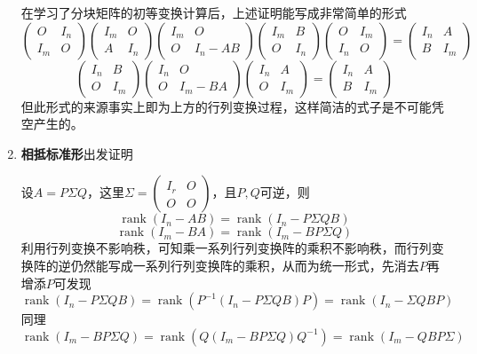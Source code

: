 \documentclass[a4paper,UTF8,fontset=windows]{ctexart}
\DeclareMathOperator{\rank}{rank}
\newcommand*{\note}{\noindent *}
\begin{document}
\begin{enumerate}
    \note 在学习了分块矩阵的初等变换计算后，上述证明能写成非常简单的形式
    $$\begin{pmatrix}O&I_n\\I_m&O\end{pmatrix}\begin{pmatrix}I_m&O\\A&I_n\end{pmatrix}\begin{pmatrix}I_m&O\\O&I_n-AB\end{pmatrix}\begin{pmatrix}I_m&B\\O&I_n\end{pmatrix}\begin{pmatrix}O&I_m\\I_n&O\end{pmatrix}=\begin{pmatrix}I_n&A\\B&I_m\end{pmatrix}$$
    $$\begin{pmatrix}I_n&B\\O&I_m\end{pmatrix}\begin{pmatrix}I_n&O\\O&I_m-BA\end{pmatrix}\begin{pmatrix}I_n&A\\O&I_m\end{pmatrix}=\begin{pmatrix}I_n&A\\B&I_m\end{pmatrix}$$
    但此形式的来源事实上即为上方的行列变换过程，这样简洁的式子是不可能凭空产生的。

    \item \textbf{相抵标准形}出发证明
    
    设$A=P\Sigma Q$，这里$\Sigma=\begin{pmatrix}I_r&O\\O&O\end{pmatrix}$，且$P,Q$可逆，则
    $$\rank(I_n-AB)=\rank(I_n-P\Sigma QB)$$
    $$\rank(I_m-BA)=\rank(I_m-BP\Sigma Q)$$
    利用行列变换不影响秩，可知乘一系列行列变换阵的乘积不影响秩，而行列变换阵的逆仍然能写成一系列行列变换阵的乘积，从而为统一形式，先消去$P$再增添$P$可发现
    $$\rank(I_n-P\Sigma QB)=\rank(P^{-1}(I_n-P\Sigma QB)P)=\rank(I_n-\Sigma QBP)$$
    同理
    $$\rank(I_m-BP\Sigma Q)=\rank(Q(I_m-BP\Sigma Q)Q^{-1})=\rank(I_m-QBP\Sigma)$$


\end{enumerate}
\end{document}
